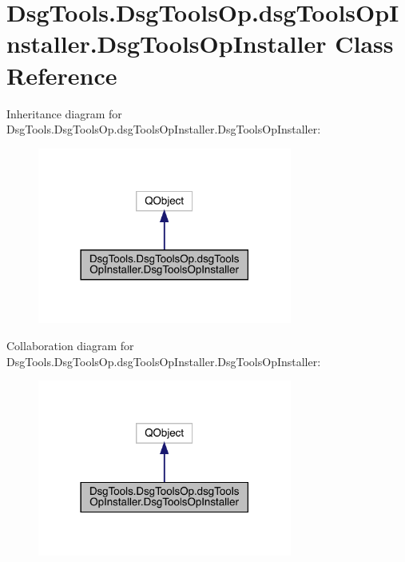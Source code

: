 \hypertarget{class_dsg_tools_1_1_dsg_tools_op_1_1dsg_tools_op_installer_1_1_dsg_tools_op_installer}{}\section{Dsg\+Tools.\+Dsg\+Tools\+Op.\+dsg\+Tools\+Op\+Installer.\+Dsg\+Tools\+Op\+Installer Class Reference}
\label{class_dsg_tools_1_1_dsg_tools_op_1_1dsg_tools_op_installer_1_1_dsg_tools_op_installer}


Inheritance diagram for Dsg\+Tools.\+Dsg\+Tools\+Op.\+dsg\+Tools\+Op\+Installer.\+Dsg\+Tools\+Op\+Installer\+:
\nopagebreak
\begin{figure}[H]
\begin{center}
\leavevmode
\includegraphics[width=237pt]{class_dsg_tools_1_1_dsg_tools_op_1_1dsg_tools_op_installer_1_1_dsg_tools_op_installer__inherit__graph}
\end{center}
\end{figure}


Collaboration diagram for Dsg\+Tools.\+Dsg\+Tools\+Op.\+dsg\+Tools\+Op\+Installer.\+Dsg\+Tools\+Op\+Installer\+:
\nopagebreak
\begin{figure}[H]
\begin{center}
\leavevmode
\includegraphics[width=237pt]{class_dsg_tools_1_1_dsg_tools_op_1_1dsg_tools_op_installer_1_1_dsg_tools_op_installer__coll__graph}
\end{center}
\end{figure}
